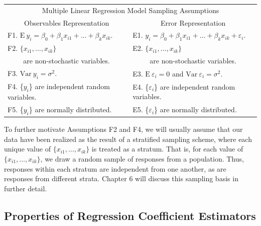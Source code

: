 \begin{center}
\begin{tabular}{cc}
\hline
\multicolumn{2}{c}{\large{Multiple Linear Regression Model Sampling Assumptions}} \\
Observables Representation & Error Representation \\ \hline
\multicolumn{1}{l}{F1. $\mathrm{E}~y_i=\beta_0+\beta_1
x_{i1}+\ldots+\beta_k x_{ik}$.} & \multicolumn{1}{l}{E1.
$y_i=\beta_0+\beta_1 x_{i1}+\ldots+\beta_k x_{ik}+\varepsilon_i$.} \\
\multicolumn{1}{l}{F2. $\{x_{i1},\ldots ,x_{ik}\}$} &
\multicolumn{1}{l}{E2.
$\{x_{i1},\ldots ,x_{ik}\}$} \\
are non-stochastic variables. & are non-stochastic variables. \\
\multicolumn{1}{l}{F3. $\mathrm{Var}~y_i=\sigma^2$.} &
\multicolumn{1}{l}{E3. $\mathrm{E}~\varepsilon_i=0$ and $\mathrm{Var}~\varepsilon_i=\sigma^2$.} \\
\multicolumn{1}{l}{F4. \{$y_i$\} are independent random variables.}
& \multicolumn{1}{l}{E4. \{$\varepsilon_i$\} are independent random
variables.} \\
\multicolumn{1}{l}{F5. \{$y_i$\} are normally distributed.} &
\multicolumn{1}{l}{E5. \{$\varepsilon_i$\} are normally distributed.} \\
\hline
\end{tabular}
\end{center}



To further motivate Assumptions F2 and F4, we will usually assume
that our data have been realized as the result of a stratified
sampling scheme, where each unique value of
$\{x_{i1},\ldots,x_{ik}\}$ is treated as a stratum. That is, for
each value of $\{x_{i1},\ldots,x_{ik}\}$, we draw a random sample of
responses from a population. Thus, responses within each stratum are
independent from one another, as are responses from different
strata. Chapter 6 will discuss this sampling basis in further
detail.

\subsection{Properties of Regression Coefficient Estimators}

